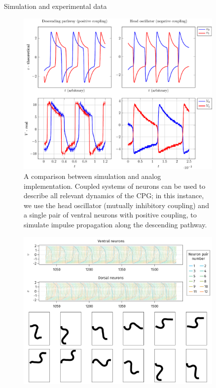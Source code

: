 \documentclass[final]{beamer}
\newlength{\sepwidth}
\newlength{\colwidth}
\newcommand{\separatorcolumn}{\begin{column}{\sepwidth}\end{column}}
\begin{document}
\begin{frame}[t]
\begin{columns}[t]
\begin{column}{\colwidth}
\end{column}

\separatorcolumn

\begin{column}{\colwidth}

  \begin{block}{Simulation and experimental data}

    \begin{figure}
        \includegraphics[width=0.9\colwidth]{figures/anal_sim/anal_sim}
        \caption{A comparison between simulation and analog implementation.  Coupled systems of neurons can be used to describe all relevant dynamics of the CPG; in this instance, we use the head oscillator (mutually inhibitory coupling) and a single pair of ventral neurons with positive coupling, to simulate impulse propagation along the descending pathway.}
    \end{figure}

    \begin{figure}
        \includegraphics[width=0.8\colwidth]{figures/worm_neuron_dash/worm_neuron_dash}
        \caption{}
    \end{figure}
\end{block}


\end{column}
\end{columns}
\end{frame}
\end{document}
